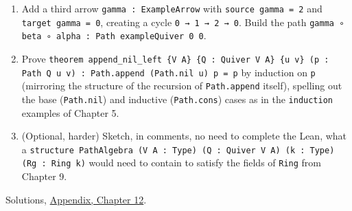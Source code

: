 \begin{enumerate}
\item
  Add a third arrow \texttt{gamma : ExampleArrow} with \texttt{source gamma = 2} and \texttt{target gamma = 0}, creating a cycle \texttt{0 → 1 → 2 → 0}. Build the path \texttt{gamma ∘ beta ∘ alpha : Path exampleQuiver 0 0}.
\item
  Prove \texttt{theorem append\_\allowbreak{}nil\_\allowbreak{}left \{V A\} \{Q : Quiver V A\} \{u v\} (p : Path Q u v) : Path.append (Path.nil u) p = p} by induction on \texttt{p} (mirroring the structure of the recursion of \texttt{Path.append} itself), spelling out the base (\texttt{Path.nil}) and inductive (\texttt{Path.cons}) cases as in the \texttt{induction} examples of Chapter 5.
\item
  (Optional, harder) Sketch, in comments, no need to complete the Lean, what a \texttt{structure PathAlgebra (V A : Type) (Q : Quiver V A) (k : Type) (Rg : Ring k)} would need to contain to satisfy the fields of \texttt{Ring} from Chapter 9.
\end{enumerate}

Solutions, \hyperref[sec:15-appendix-solutions:12-chapter-12:1]{Appendix, Chapter 12}.

